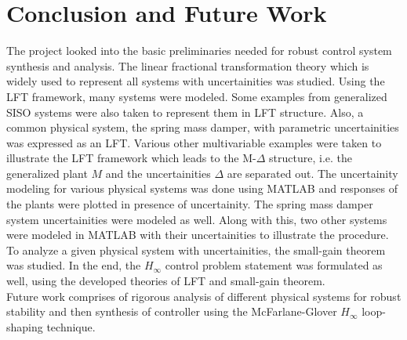\documentclass[a4paper,12pt]{article}
\begin{document}
		\section{Conclusion and Future Work}
The project looked into the basic preliminaries needed for robust control system synthesis and analysis. The linear fractional transformation theory which is widely used to represent all systems with uncertainities was studied. Using the LFT framework, many systems were modeled. Some examples from generalized SISO systems were also taken to represent them in LFT structure. Also, a common physical system, the spring mass damper, with parametric uncertainities was expressed as an LFT. Various other multivariable examples were taken to illustrate the LFT framework which leads to the M-$\Delta$ structure, i.e. the generalized plant $M$ and the uncertainities $\Delta$ are separated out. The uncertainity modeling for various physical systems was done using MATLAB and responses of the plants were plotted in presence of uncertainity. The spring mass damper system uncertainities were modeled as well. Along with this, two other systems were modeled in MATLAB with their uncertainities to illustrate the procedure. To analyze a given physical system with uncertainities, the small-gain theorem was studied. In the end, the $H_{\infty}$ control problem statement was formulated as well, using the developed theories of LFT and small-gain theorem.\\
Future work comprises of rigorous analysis of different physical systems for robust stability and then synthesis of controller using the McFarlane-Glover $H_{\infty}$ loop-shaping technique.
\printbibliography 
%
\end{document}

